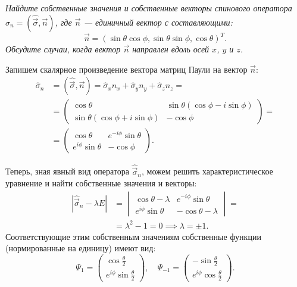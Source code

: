 \begin{exercise}
  \textit{Найдите собственные значения и собственные векторы спинового оператора
    $\hat{\sigma}_n = (\hat{\Vec{\sigma}}, \Vec{n})$, где $\Vec{n}$ --- единичный
    вектор с составляющими:}
  \[
    \Vec{n} = (\sin\theta\cos\phi, \sin\theta\sin\phi, \cos\theta)^T.
  \]
  \textit{Обсудите случаи, когда вектор $\Vec{n}$ направлен вдоль осей $x$, $y$ и
    $z$.}
\end{exercise}

Запишем скалярное произведение вектора матриц Паули на вектор $\Vec{n}$:
\begin{align*}
  \hat{\sigma}_n & = (\hat{\Vec{\sigma}}, \Vec{n})  = \hat{\sigma}_x n_x + \hat{\sigma}_y n_y + \hat{\sigma}_z n_z= \\
  & = \begin{pmatrix} \cos\theta & \sin\theta(\cos\phi - i\sin\phi) \\ \sin\theta(\cos\phi + i\sin\phi)  & -\cos\phi \end{pmatrix} = \\
  & = \begin{pmatrix} \cos\theta & e^{-i\phi} \sin\theta \\ e^{i\phi} \sin\theta & -\cos\phi \end{pmatrix}.
\end{align*}

Теперь, зная явный вид оператора $\hat{\Vec{\sigma}}_n$, можем решить
характеристическое уравнение и найти собственные значения и векторы:
\begin{align*}
  |\hat{\Vec{\sigma}}_{n} - \lambda E| & = \begin{vmatrix} \cos\theta - \lambda & e^{-i\phi}\sin\theta \\ e^{i\phi}\sin\theta & -\cos\theta - \lambda \end{vmatrix} = \\
  &= \lambda^2 - 1 = 0 \implies \lambda = \pm 1.
\end{align*}
Соответствующие этим собственным значениям собственные функции (нормированные
на единицу) имеют вид:
\[
  \Psi_1 = \begin{pmatrix} \cos \frac{\theta}{2} \\ e^{i\phi} \sin\frac{\theta}{2}\end{pmatrix}, \quad
  \Psi_{-1} = \begin{pmatrix} -\sin\frac{\theta}{2} \\ e^{i\phi}\cos\frac{\theta}{2} \end{pmatrix}.
\]

